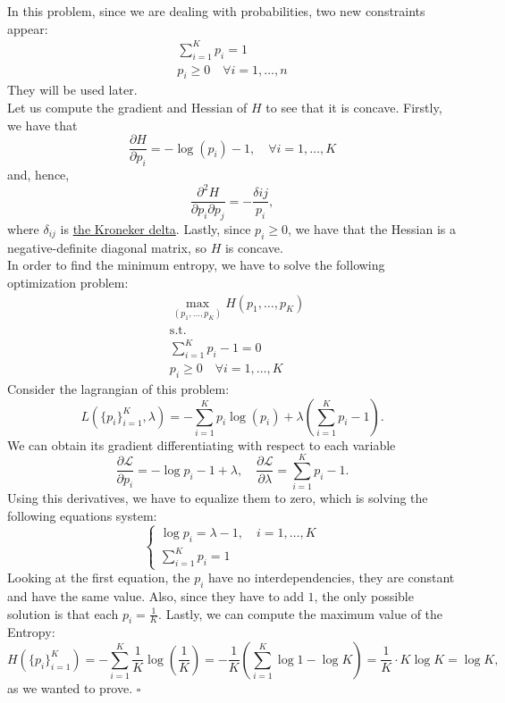 \documentclass[11pt,table]{article}
\newcommand{\qed}{\hfill $\square$}
\begin{document}
In this problem, since we are dealing with probabilities, two new constraints appear:
\begin{align*}
	\sum_{i=1}^K p_i = 1 \\
	p_i \geq 0 \quad \forall i =1,\dots,n
\end{align*}
They will be used later.\\

Let us compute the gradient and Hessian of \(H\) to see that it is concave. Firstly, we have that
\[
	\frac{\partial H}{\partial p_i} = - \log(p_i) - 1, \quad \forall i = 1,\dots,K
\]
and, hence,
\[
	\frac{\partial^2 H}{\partial p_i \partial p_j} = - \frac{\delta{ij}}{p_i},
\]
where $\delta_{ij}$ is \href{https://en.wikipedia.org/wiki/Kronecker_delta}{the Kroneker delta}. Lastly, since \(p_i \geq 0\), we have that the Hessian is a negative-definite diagonal matrix, so \(H\) is concave.\\

In order to find the minimum entropy, we have to solve the following optimization problem:
\begin{align*}
	 & \max_{(p_1,\dots,p_K)} H(p_1,\dots,p_K) \\
	 & \text{s.t.}                             \\
	 & \sum_{i=1}^K p_i -1 = 0                 \\
	 & p_i \geq 0 \quad \forall i =1,\dots,K
\end{align*}
Consider the lagrangian of this problem:
\[
	L\left(\{p_i\}_{i=1}^K, \lambda\right) = - \sum_{i=1}^K p_i \log(p_i) + \lambda\left(\sum_{i=1}^K p_i -1\right).
\]
We can obtain its gradient differentiating with respect to each variable
\[
	\frac{\partial \mathcal L}{\partial p_i} = - \log p_i - 1 + \lambda, \quad \frac{\partial \mathcal L}{\partial \lambda} =  \sum_{i=1}^K p_i -1.
\]
Using this derivatives, we have to equalize them to zero, which is solving the following equations system:
\[
	\begin{cases}
		\log p_i = \lambda - 1, \quad i = 1,\dots,K \\
		\sum_{i=1}^K p_i = 1
	\end{cases}
\]
Looking at the first equation, the \(p_i\) have no interdependencies, they are constant and have the same value. Also, since they have to add \(1\), the only possible solution is that each \(p_i = \frac{1}{K}\). Lastly, we can compute the maximum value of the Entropy:
\[
	H\left(\{p_i\}_{i=1}^K\right) = - \sum_{i=1}^K \frac{1}{K} \log \left(\frac{1}{K}\right)  = - \frac{1}{K} \left(\sum_{i=1}^K \log 1 - \log K\right) = \frac{1}{K} \cdot K \log K = \log K,
\]
as we wanted to prove. \qed
\end{document}
